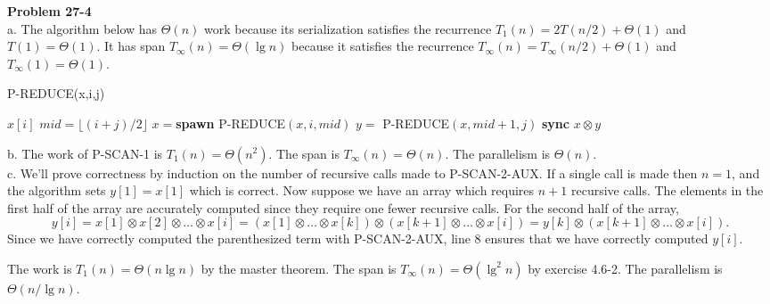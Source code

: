 \documentclass{article}
\begin{document}
\noindent\textbf{Problem 27-4}\\

a. The algorithm below has $\Theta(n)$ work because its serialization satisfies the recurrence $T_1(n) = 2T(n/2) + \Theta(1)$ and $T(1) = \Theta(1)$.  It has span $T_\infty(n) = \Theta(\lg n)$ because it satisfies the recurrence $T_\infty(n) = T_\infty(n/2) + \Theta(1)$ and $T_\infty(1) = \Theta(1)$. \\

\begin{algorithm}
\caption{P-REDUCE(x,i,j)}
\begin{algorithmic}[1]
	\State \Return $x[i]$
\Else
	\State $mid = \lfloor (i+j)/2 \rfloor$
	\State $x = $\textbf{spawn} P-REDUCE$(x,i, mid)$
	\State $y = $ P-REDUCE$(x,mid+1, j)$
	\State \textbf{sync}
	\State \Return $x \otimes y$
\EndIf
\end{algorithmic}
\end{algorithm}

b. The work of P-SCAN-1 is $T_1(n) = \Theta(n^2)$.  The span is $T_\infty(n) = \Theta(n)$.  The parallelism is $\Theta(n)$. \\

c. We'll prove correctness by induction on the number of recursive calls made to P-SCAN-2-AUX.  If a single call is made then $n=1$, and the algorithm sets $y[1] = x[1]$ which is correct.  Now suppose we have an array which requires $n+1$ recursive calls.  The elements in the first half of the array are accurately computed since they require one fewer recursive calls. For the second half of the array, 
\[y[i] = x[1] \otimes x[2] \otimes \ldots \otimes x[i] = (x[1] \otimes \ldots \otimes x[k]) \otimes (x[k+1] \otimes \ldots \otimes x[i]) = y[k] \otimes (x[k+1] \otimes \ldots \otimes x[i]).\]
Since we have correctly computed the parenthesized term with P-SCAN-2-AUX, line 8 ensures that we have correctly computed $y[i]$. 

The work is $T_1(n) = \Theta(n \lg n)$ by the master theorem.  The span is $T_\infty(n) = \Theta(\lg^2n)$ by exercise 4.6-2. The parallelism is $\Theta(n/\lg n)$.\\
\end{document}
